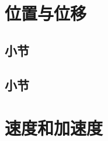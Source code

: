 \documentclass[color=purple,openany]{textbook-cn}
\begin{document}
\section{位置与位移}

\begin{Point}
\lipsum[2]
\end{Point}

\begin{Case*}
\item \lipsum[1][3]
\item \lipsum[1][3]
\item \lipsum[1][3]
\item \lipsum[1][3]
\end{Case*}


\subsection{小节}
\subsection*{小节}

\Answer{\lipsum[2][1]}


\begin{Link}
\zhlipsum[1]
\end{Link}


\clearpage
\begin{Thinking}
\begin{QsNum}
\item \lipsum[1][3]
\item \lipsum[1][3]
\item \lipsum[1][3]
\item \lipsum[1][3]
\end{QsNum}
\tcblower
\lipsum[1]
\end{Thinking}


\section{速度和加速度}

\begin{Point}
\lipsum[2]
\end{Point}

\begin{Case}
\item \lipsum[1][3]
\item \lipsum[1][3]
\item \lipsum[1][3]
\item \lipsum[1][3]
\end{Case}
\end{document}
